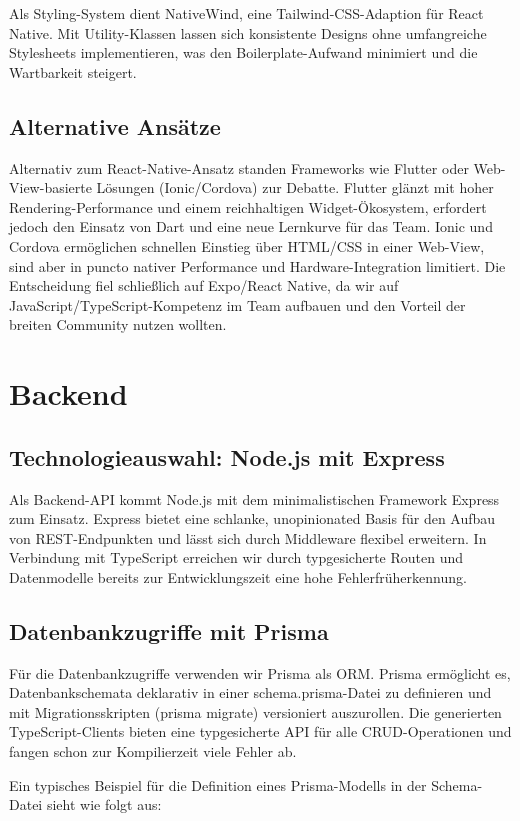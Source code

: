 Als Styling-System dient NativeWind, eine Tailwind-CSS-Adaption für React Native. Mit Utility-Klassen lassen sich konsistente Designs ohne umfangreiche Stylesheets implementieren, was den Boilerplate-Aufwand minimiert und die Wartbarkeit steigert.

\subsection{Alternative Ansätze}
Alternativ zum React-Native-Ansatz standen Frameworks wie Flutter oder Web-View-basierte Lösungen (Ionic/Cordova) zur Debatte. Flutter glänzt mit hoher Rendering-Performance und einem reichhaltigen Widget-Ökosystem, erfordert jedoch den Einsatz von Dart und eine neue Lernkurve für das Team. Ionic und Cordova ermöglichen schnellen Einstieg über HTML/CSS in einer Web-View, sind aber in puncto nativer Performance und Hardware-Integration limitiert. Die Entscheidung fiel schließlich auf Expo/React Native, da wir auf JavaScript/TypeScript-Kompetenz im Team aufbauen und den Vorteil der breiten Community nutzen wollten.

\section{Backend}
\subsection{Technologieauswahl: Node.js mit Express}
Als Backend-API kommt Node.js mit dem minimalistischen Framework Express zum Einsatz. Express bietet eine schlanke, unopinionated Basis für den Aufbau von REST-Endpunkten und lässt sich durch Middleware flexibel erweitern. In Verbindung mit TypeScript erreichen wir durch typgesicherte Routen und Datenmodelle bereits zur Entwicklungszeit eine hohe Fehlerfrüherkennung.

\subsection{Datenbankzugriffe mit Prisma}
Für die Datenbankzugriffe verwenden wir Prisma als ORM. Prisma ermöglicht es, Datenbankschemata deklarativ in einer schema.prisma-Datei zu definieren und mit Migrationsskripten (prisma migrate) versioniert auszurollen. Die generierten TypeScript-Clients bieten eine typgesicherte API für alle CRUD-Operationen und fangen schon zur Kompilierzeit viele Fehler ab.

Ein typisches Beispiel für die Definition eines Prisma-Modells in der Schema-Datei sieht wie folgt aus:

